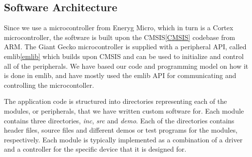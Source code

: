 \subsection{Software Architecture}

Since we use a microcontroller from Eneryg Micro, which in turn
is a Cortex microcontroller, the software is built upon the
CMSIS\ref{CMSIS} codebase from ARM. The Giant Gecko
microcontroller is supplied with a peripheral API, called
emlib\ref{emlib} which builds upon CMSIS and can be used to
initialize and control all of the peripherals. We have based our
code and programming model on how it is done in emlib, and have
mostly used the emlib API for communicating and controlling the
microcontoller. 

The application code is structured into directories representing
each of the modules, or peripherals, that we have written custom
software for. Each module contains three directories,
\textit{inc}, \textit{src} and \textit{demo}. Each of the
directories contains header files, source files and different
demos or test programs for the modules, respectively. Each
module is typically implemented as a combination of a driver and
a controller for the specific device that it is designed for.
